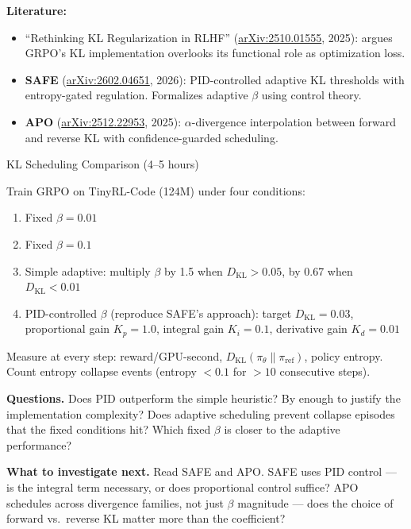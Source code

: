 \textbf{Literature:}
\begin{itemize}
  \item ``Rethinking KL Regularization in RLHF'' (\href{https://arxiv.org/abs/2510.01555}{arXiv:2510.01555}, 2025): argues GRPO's KL implementation overlooks its functional role as optimization loss.
  \item \textbf{SAFE} (\href{https://arxiv.org/abs/2602.04651}{arXiv:2602.04651}, 2026): PID-controlled adaptive KL thresholds with entropy-gated regulation. Formalizes adaptive $\beta$ using control theory.
  \item \textbf{APO} (\href{https://arxiv.org/abs/2512.22953}{arXiv:2512.22953}, 2025): $\alpha$-divergence interpolation between forward and reverse KL with confidence-guarded scheduling.
\end{itemize}

\begin{exercise}{KL Scheduling Comparison (4--5 hours)}

Train GRPO on TinyRL-Code (124M) under four conditions:
\begin{enumerate}[label=(\alph*)]
  \item Fixed $\beta = 0.01$
  \item Fixed $\beta = 0.1$
  \item Simple adaptive: multiply $\beta$ by 1.5 when $D_{\mathrm{KL}} > 0.05$, by 0.67 when $D_{\mathrm{KL}} < 0.01$
  \item PID-controlled $\beta$ (reproduce SAFE's approach): target $D_{\mathrm{KL}} = 0.03$, proportional gain $K_p = 1.0$, integral gain $K_i = 0.1$, derivative gain $K_d = 0.01$
\end{enumerate}

Measure at every step: reward/GPU-second, $D_{\mathrm{KL}}(\pi_\theta \| \pi_{\mathrm{ref}})$, policy entropy. Count entropy collapse events (entropy $< 0.1$ for $> 10$ consecutive steps).

\textbf{Questions.} Does PID outperform the simple heuristic? By enough to justify the implementation complexity? Does adaptive scheduling prevent collapse episodes that the fixed conditions hit? Which fixed $\beta$ is closer to the adaptive performance?

\textbf{What to investigate next.} Read SAFE and APO. SAFE uses PID control --- is the integral term necessary, or does proportional control suffice? APO schedules across divergence families, not just $\beta$ magnitude --- does the choice of forward vs.\ reverse KL matter more than the coefficient?
\end{exercise}

